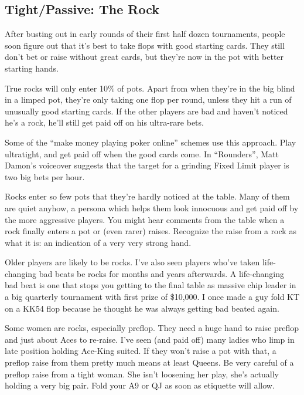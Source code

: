 \subsection{Tight/Passive: The Rock}

After busting out in early rounds of their first half dozen
tournaments, people soon figure out that it's best to take flops
with good starting cards. They still don't bet or raise without
great cards, but they're now in the pot with better starting hands.

True rocks will only enter 10\% of pots. Apart from when they're
in the big blind in a limped pot, they're only taking one
flop per round, unless they hit a run of unusually good starting
cards. If the other players are bad and haven't noticed
he's a rock, he'll still get paid off on his ultra-rare bets.

Some of the ``make money playing poker online'' schemes use this
approach. Play ultratight, and get paid off when the good cards
come. In ``Rounders'', Matt Damon's voiceover suggests that
the target for a grinding Fixed Limit player is two big bets per
hour.

Rocks enter so few pots that they're hardly noticed
at the table. Many of them are quiet anyhow,
a persona which helps them look innocuous and get paid off by the
more aggressive players. You might hear comments from the table
when a rock finally enters a pot or (even rarer) raises. Recognize
the raise from a rock as what it is: an indication of a very very
strong hand.

Older players are likely to be rocks. I've also seen players who've
taken life-changing bad beats be rocks for months and years
afterwards. A life-changing bad beat is one that stops you getting to
the final table as massive chip leader in a big quarterly tournament
with first prize of \$10,000. I once made a guy fold KT on a KK54 flop
because he thought he was always getting bad beated again.

Some women are rocks, especially preflop. They
need a huge hand to raise preflop and just about Aces to
re-raise. I've seen (and paid off) many ladies who limp in late
position holding Ace-King suited. If they won't raise a pot with that,
a preflop raise from them pretty much means at least Queens. Be very
careful of a preflop raise from a tight woman. She isn't
loosening her play, she's actually holding a very
big pair. Fold your A9 or QJ as soon as etiquette will allow.

